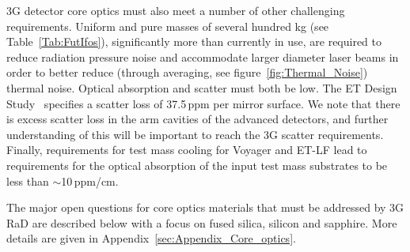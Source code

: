 \ac{3G}  detector core optics must also meet a number of other challenging requirements. 
Uniform and pure masses of several hundred kg (see Table~\ref{Tab:FutIfos}), significantly more than currently in use, are required to reduce radiation pressure noise and accommodate larger diameter laser beams in order to better reduce (through averaging, see figure~\ref{fig:Thermal_Noise}) thermal noise. Optical absorption and scatter must both be low. The \ac{ET}  Design Study~\cite{ET2011} specifies a scatter loss of 37.5\,ppm per mirror surface. We note that there is excess scatter loss in the arm cavities of the advanced detectors, and further understanding of this will be important to reach the \ac{3G}  scatter requirements. Finally, requirements for test mass cooling for Voyager and \ac{ET-LF}   lead to requirements for the optical absorption of the input test mass substrates to be less than $\sim$10\,ppm/cm.

The major open questions for core optics materials that must be addressed by \ac{3G}  \ac{RaD}   are described below with a focus on fused silica, silicon and sapphire. More details are given in Appendix~\ref{sec:Appendix_Core_optics}.





